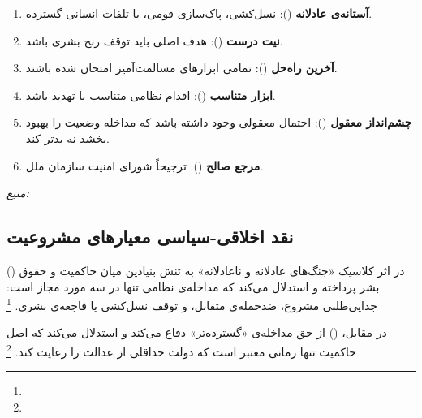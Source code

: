 \begin{tcolorbox}[legalbox, title={معیارهای مشروعیت مداخله‌ی انسان‌دوستانه (بر اساس گزارش \lr{ICISS})}]
\begin{enumerate}[nosep, label=\textbf{\arabic*.}]
  \item \textbf{آستانه‌ی عادلانه} (): نسل‌کشی، پاک‌سازی قومی، یا تلفات انسانی گسترده.
  \item \textbf{نیت درست} (): هدف اصلی باید توقف رنج بشری باشد.
  \item \textbf{آخرین راه‌حل} (): تمامی ابزارهای مسالمت‌آمیز امتحان شده باشند.
  \item \textbf{ابزار متناسب} (): اقدام نظامی متناسب با تهدید باشد.
  \item \textbf{چشم‌انداز معقول} (): احتمال معقولی وجود داشته باشد که مداخله وضعیت را بهبود بخشد نه بدتر کند.
  \item \textbf{مرجع صالح} (): ترجیحاً شورای امنیت سازمان ملل.
\end{enumerate}
\vspace{4pt}
\textit{منبع:} 
\end{tcolorbox}

\subsection{نقد اخلاقی-سیاسی معیارهای مشروعیت}
\label{subsec:ch02-hum-critique}

 () در اثر کلاسیک «جنگ‌های عادلانه و ناعادلانه» به تنش بنیادین میان حاکمیت و حقوق بشر پرداخته و استدلال می‌کند که مداخله‌ی نظامی تنها در سه مورد مجاز است: جدایی‌طلبی مشروع، ضدحمله‌ی متقابل، و توقف نسل‌کشی یا فاجعه‌ی بشری.%
\footnote{}

در مقابل،  () از حق مداخله‌ی «گسترده‌تر» دفاع می‌کند و استدلال می‌کند که اصل حاکمیت تنها زمانی معتبر است که دولت حداقلی از عدالت را رعایت کند.%
\footnote{}

